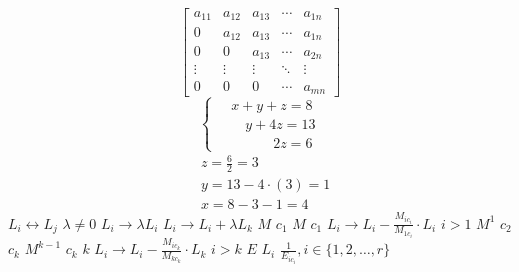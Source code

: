 \documentclass{article}
\begin{document}
$$
\begin{bmatrix}
a_{11} & a_{12} & a_{13} & \cdots & a_{1n} \\
0 & a_{12} & a_{13} & \cdots & a_{1n} \\
0 & 0 & a_{13} & \cdots & a_{2n} \\
\vdots & \vdots & \vdots & \ddots & \vdots \\
0 & 0 & 0 & \cdots & a_{mn}
\end{bmatrix}
$$
$$
  \begin{cases}
  \quad x+y+z=8\\
  \qquad y+4z=13\\
  \qquad\qquad2z=6
  \end{cases}
$$
$$
\begin{align}
  &z = \frac{6}{2} = 3\\
  &y = 13 - 4\cdot\left(3\right) = 1\\
  &x = 8 - 3 - 1 = 4
\end{align}
$$
$L_i \longleftrightarrow L_j$
$\lambda\neq 0$
$L_i \rightarrow \lambda L_i$
$L_i \rightarrow L_i + \lambda L_k$
$M$
$c_1$
$M$
$c_1$
$L_i \rightarrow L_i - \frac{M_{ic_i}}{M_{1c_i}}\cdot L_i$
$i>1$
$M^1$
$c_2$
$c_k$
$M^{k-1}$
$c_k$
$k$
$L_i \rightarrow L_i - \frac{M_{ic_k}}{M_{kc_k}}\cdot L_k$
$i>k$
$E$
$L_i$
$\frac{1}{E_{ic_i}}, i \in\{1,2,\dots,r\}$
\end{document}
